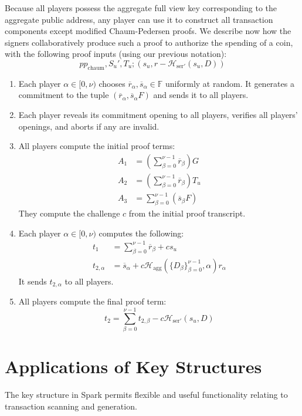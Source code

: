 \documentclass{llncs}
\newcommand{\F}{\mathbb{F}}
\newcommand{\hash}{\mathcal{H}}
\begin{document}
Because all players possess the aggregate full view key corresponding to the aggregate public address, any player can use it to construct all transaction components except modified Chaum-Pedersen proofs.
We describe now how the signers collaboratively produce such a proof to authorize the spending of a coin, with the following proof inputs (using our previous notation):
$$pp_{\text{chaum}}, S_u', T_u; (s_u, r - \hash_{\text{ser}'}(s_u, D))$$

\begin{enumerate}
\item Each player $\alpha \in [0,\nu)$ chooses $\overline{r}_\alpha, \overline{s}_\alpha \in \F$ uniformly at random.
It generates a commitment to the tuple $(\overline{r}_\alpha, \overline{s}_\alpha F)$ and sends it to all players.
\item Each player reveals its commitment opening to all players, verifies all players' openings, and aborts if any are invalid.
\item All players compute the initial proof terms:
\begin{align*}
A_1 &= \left( \sum_{\beta=0}^{\nu-1} \overline{r}_\beta \right) G \\
A_2 &= \left( \sum_{\beta=0}^{\nu-1} \overline{r}_\beta \right) T_u \\
A_3 &= \sum_{\beta=0}^{\nu-1} (\overline{s}_\beta F)
\end{align*}
They compute the challenge $c$ from the initial proof transcript.
\item Each player $\alpha \in [0,\nu)$ computes the following:
\begin{align*}
t_1 &= \sum_{\beta=0}^{\nu-1} \overline{r}_\beta + cs_u \\
t_{2,\alpha} &= \overline{s}_\alpha + c\hash_{\text{agg}}\left( \{D_\beta\}_{\beta=0}^{\nu-1}, \alpha \right) r_\alpha
\end{align*}
It sends $t_{2,\alpha}$ to all players.
\item All players compute the final proof term: $$t_2 = \sum_{\beta=0}^{\nu-1} t_{2,\beta} - c\hash_{\text{ser}'}(s_u,D)$$
\end{enumerate}


\section{Applications of Key Structures}

The key structure in Spark permits flexible and useful functionality relating to transaction scanning and generation.
\end{document}
